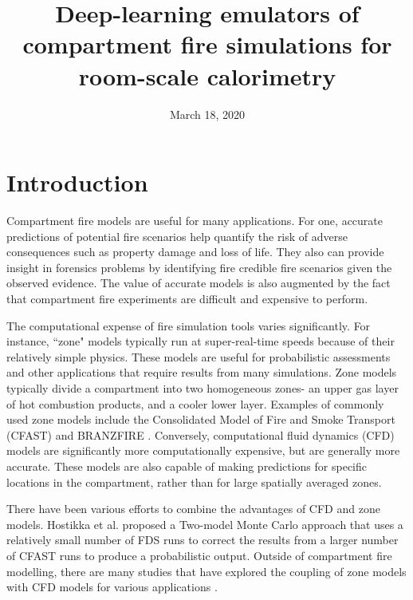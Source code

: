 \documentclass{article}
\begin{document}
\title{Deep-learning emulators of compartment fire simulations for room-scale calorimetry}




\author{}
\date{March 18, 2020} 

\maketitle

\begin{abstract}

\end{abstract}
\section{Introduction}
Compartment fire models are useful for many applications. For one, accurate predictions of potential fire scenarios help quantify the risk of adverse consequences such as property damage and loss of life. They also can provide insight in forensics problems by identifying fire credible fire scenarios given the observed evidence. The value of accurate models is also augmented by the fact that compartment fire experiments are difficult and expensive to perform. 

The computational expense of fire simulation tools varies significantly. For instance,  ``zone" models typically run at super-real-time speeds because of their relatively simple physics. These models are useful for probabilistic assessments \cite{anderson2018quantifying, baker2013developing} and other applications that require results from many simulations. Zone models typically divide a compartment into two homogeneous zones- an upper gas layer of hot combustion products, and a cooler lower layer. Examples of commonly used zone models include the Consolidated Model of Fire and Smoke Transport (CFAST) \cite{peacock1993cfast} and BRANZFIRE \cite{wade2000branzfire}. Conversely, computational fluid dynamics (CFD) models are significantly more computationally expensive, but are generally more accurate. These models are also capable of making predictions for specific locations in the compartment, rather than for large spatially averaged zones. 

There have been various efforts to combine the advantages of CFD and zone models. Hostikka et al. \cite{hostikka2005two} proposed a Two-model Monte Carlo approach that uses a relatively small number of FDS runs to correct the results from a larger number of CFAST runs to produce a probabilistic output. Outside of compartment fire modelling, there are many studies that have explored the coupling of zone models with CFD models for various applications \cite{dreng2008method, tan2005application, wang2007validation, colella2009calculation, floyd2011coupling, colella2011multiscale}. 
\end{document}
